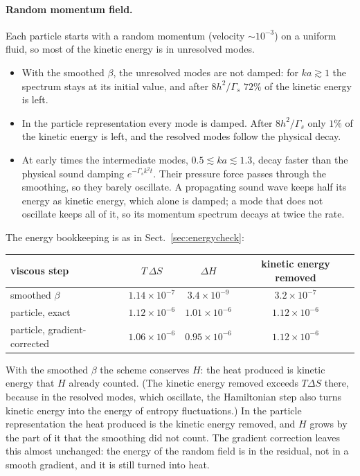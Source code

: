 \documentclass[11pt,aps,preprint,nofootinbib,superscriptaddress,tightenlines]{revtex4-2}
\def\Sect#1{Sect.~\ref{#1}}
\let\oldparagraph\paragraph
\renewcommand{\paragraph}{\par\bigskip\oldparagraph}
\begin{document}
\paragraph{Random momentum field.}  Each particle starts with a random momentum
(velocity $\sim10^{-3}$) on a uniform fluid, so most of the kinetic energy is in
unresolved modes.
\begin{itemize}
\item With the smoothed $\beta$, the unresolved modes are not damped: for
  $ka\gtrsim1$ the spectrum stays at its initial value, and after $8h^2/\Gamma_s$
  $72\%$ of the kinetic energy is left.
\item In the particle representation every mode is damped.  After
  $8h^2/\Gamma_s$ only $1\%$ of the kinetic energy is left, and the resolved
  modes follow the physical decay.
\item At early times the intermediate modes, $0.5\lesssim ka\lesssim1.3$, decay
  faster than the physical sound damping $e^{-\Gamma_sk^2t}$.  Their pressure
  force passes through the smoothing, so they barely oscillate.  A propagating
  sound wave keeps half its energy as kinetic energy, which alone is damped; a
  mode that does not oscillate keeps all of it, so its momentum spectrum decays
  at twice the rate.
\end{itemize}
The energy bookkeeping is as in \Sect{sec:energycheck}:
\begin{center}
\begin{tabular}{l c c c}
\hline\hline
viscous step & $T\,\Delta S$ & $\Delta H$ & kinetic energy removed\\
\hline
smoothed $\beta$ & $1.14\times10^{-7}$ & $3.4\times10^{-9}$ & $3.2\times10^{-7}$\\
particle, exact & $1.12\times10^{-6}$ & $1.01\times10^{-6}$ & $1.12\times10^{-6}$\\
particle, gradient-corrected & $1.06\times10^{-6}$ & $0.95\times10^{-6}$ & $1.12\times10^{-6}$\\
\hline\hline
\end{tabular}
\end{center}
With the smoothed $\beta$ the scheme conserves $H$: the heat produced is kinetic
energy that $H$ already counted.  (The kinetic energy removed exceeds $T\Delta S$
there, because in the resolved modes, which oscillate, the Hamiltonian step also
turns kinetic energy into the energy of entropy fluctuations.)  In
the particle representation the heat produced is the kinetic energy removed,
and $H$ grows by the part of it that the smoothing did not count.  The gradient
correction leaves this almost unchanged: the energy of the random field is in the
residual, not in a smooth gradient, and it is still turned into heat.
\end{document}
